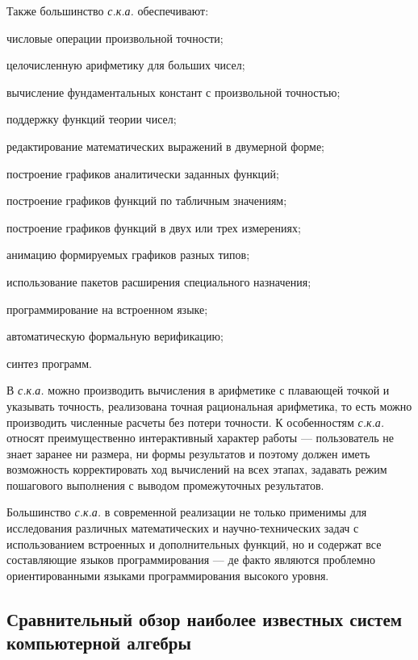 Также большинство \textit{с.к.а.} обеспечивают:
\begin{textitemize}
	\item числовые операции произвольной точности; 
	\item целочисленную арифметику для больших чисел;
	\item вычисление фундаментальных констант с произвольной точностью;
	\item поддержку функций теории чисел;
	\item редактирование математических выражений в двумерной форме; 
	\item построение графиков аналитически заданных функций; 
	\item построение графиков функций по табличным значениям; 
	\item построение графиков функций в двух или трех измерениях;
	\item анимацию формируемых графиков разных типов;
	\item использование пакетов расширения специального назначения;
	\item программирование на встроенном языке;
	\item автоматическую формальную верификацию;
	\item синтез программ.
\end{textitemize}

В \textit{с.к.а.} можно производить вычисления в арифметике с плавающей точкой и указывать точность, реализована точная рациональная арифметика, то есть можно производить численные расчеты без потери точности. К особенностям \textit{с.к.а.} относят преимущественно интерактивный характер работы --- пользователь не знает заранее ни размера, ни формы результатов и поэтому должен иметь возможность корректировать ход вычислений на всех этапах, задавать режим пошагового выполнения с выводом промежуточных результатов.

Большинство \textit{с.к.а.} в современной реализации не только применимы для исследования различных математических и научно-технических задач с использованием встроенных и дополнительных функций, но и содержат все составляющие языков программирования --- де факто являются проблемно ориентированными языками программирования высокого уровня. 

\subsection{Сравнительный обзор наиболее известных систем компьютерной алгебры}
\label{subsec_cas_survey}

